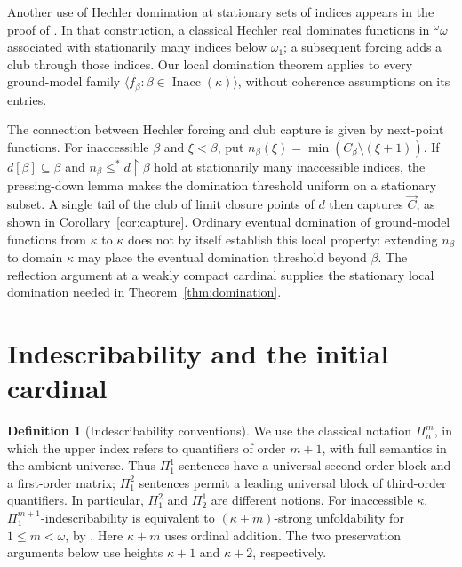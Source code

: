 \documentclass[11pt,a4paper]{amsart}
\theoremstyle{definition}
\newtheorem{definition}[theorem]{Definition}
\theoremstyle{remark}
\DeclareMathOperator{\Inacc}{Inacc}
\begin{document}
Another use of Hechler domination at stationary sets of indices appears in
the proof of \cite[Lemma 20]{LL}.
In that construction, a classical Hechler real dominates
functions in \({}^\omega\omega\) associated with stationarily
many indices below \(\omega_1\); a subsequent forcing adds a
club through those indices. Our local domination theorem applies
to every ground-model family
\(\langle f_\beta:\beta\in\Inacc(\kappa)\rangle\),
without coherence assumptions on its entries.

The connection between Hechler forcing and club capture is
given by next-point functions. For inaccessible \(\beta\)
and \(\xi<\beta\), put
\(n_\beta(\xi)=\min(C_\beta\setminus(\xi+1))\).
If \(d[\beta]\subseteq\beta\) and
\(n_\beta\leq^*d\restriction\beta\) hold at stationarily
many inaccessible indices, the pressing-down lemma makes the domination
threshold uniform on a stationary subset. A single tail of the
club of limit closure points of \(d\) then captures \(\vec C\),
as shown in Corollary~\ref{cor:capture}. Ordinary eventual
domination of ground-model functions from \(\kappa\) to \(\kappa\)
does not by itself establish this local property: extending
\(n_\beta\) to domain \(\kappa\) may place the eventual
domination threshold beyond \(\beta\). The reflection argument
at a weakly compact cardinal supplies the stationary local
domination needed in Theorem~\ref{thm:domination}.

\section{Indescribability and the initial cardinal}\label{sec:initial}

\begin{definition}[Indescribability conventions]
\label{def:indescribable}
We use the classical notation \(\Pi^m_n\), in which the upper
index refers to quantifiers of order \(m+1\), with full
semantics in the ambient universe. Thus \(\Pi^1_1\) sentences
have a universal second-order block and a first-order matrix;
\(\Pi^2_1\) sentences permit a leading universal block of
third-order quantifiers. In particular, \(\Pi^2_1\) and
\(\Pi^1_2\) are different notions.
For inaccessible \(\kappa\), \(\Pi^{m+1}_1\)-indescribability
is equivalent to \((\kappa+m)\)-strong unfoldability for
\(1\leq m<\omega\), by \cite[Corollary 35]{Johnstone}.
Here \(\kappa+m\) uses ordinal addition. The two preservation
arguments below use heights \(\kappa+1\) and \(\kappa+2\),
respectively.
\end{definition}
\end{document}
